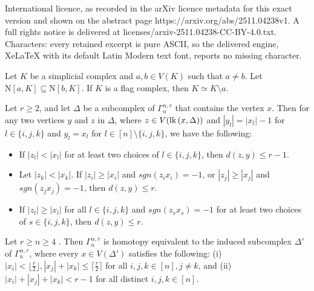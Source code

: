 \documentclass[10pt,a4paper]{amsart}
\def\n{{\mathrm{N}}}
\newcommand{\D}{\Delta}
\newcommand{\cil}{\lceil\frac{r}{2}\rceil}
\newcommand{\f}{\lfloor\frac{r}{2}\rfloor}
\newcommand{\lk}{\mbox{\upshape lk}\,}
\begin{document}
International licence, as recorded in the arXiv licence metadata for this exact version and shown on the abstract page https://arxiv.org/abs/2511.04238v1. A full rights notice is delivered at licenses/arxiv-2511.04238-CC-BY-4.0.txt. Characters: every retained excerpt is pure ASCII, so the delivered engine, XeLaTeX with its default Latin Modern text font, reports no missing character.
\begin{proposition}\label{flag}
	Let $K$ be a simplicial complex and $a,b\in V(K)$ such that $a \neq b$. Let $\n[a, K]\subseteq \n[b, K]$. If $K$ is a flag complex, then $K \simeq K \setminus a$.
\end{proposition}

\begin{lemma}\label{threevertex}
	Let $r\geq 2$, and let  $\D$ be  a subcomplex of $\Gamma_n^{\alpha, r}$ that contains the vertex $x$. Then for any two vertices $y$ and $z$ in $\D$, where $z\in V(\lk(x,\D))$ and  $|y_l|=|x_l|-1$ for $l\in\{i,j,k\}$ and $y_l=x_l$ for $l\in [n]\setminus\{i,j,k\}$, we have the following: 
	\begin{itemize}
		\item[(i)]  If $|z_l|<|x_l|$ for at least two choices of $l\in\{i,j,k\}$,  then $d(z,y)\leq  r-1$.
		\item[(ii)]  Let $|z_k|<|x_k|$. If $|z_i|\geq |x_i|$ and $sgn(z_ix_i)=-1$,  or $|z_j|\geq |x_j|$ and $sgn(z_jx_j)=-1$, then $d(z,y)\leq  r$.
		\item[(iii)] If $|z_l|\geq |x_l|$ for all $l\in\{i,j,k\}$ and $sgn(z_sx_s)=-1$ for at least two choices of $s\in\{i,j,k\}$, then $d(z,y)\leq r$.
	\end{itemize}
	
\end{lemma}

\begin{lemma}\label{sumofthree}
	Let $r\geq n\geq 4$ . Then $\Gamma_n^{\alpha, r}$ is homotopy equivalent to the induced subcomplex $\Delta'$ of $\Gamma_n^{\alpha, r}$, where every $x \in V(\Delta')$ satisfies the following: (i) $|x_i|< \f, |x_j|+|x_k|\leq \cil$ for all $i, j, k \in [n], j \neq k$, and (ii) $|x_i| + |x_j| + |x_k| < r-1$ for all distinct $i, j, k \in [n]$. 
\end{lemma}
\end{document}
